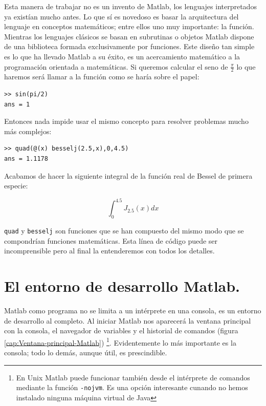 Esta manera de trabajar no es un invento de Matlab, los lenguajes
interpretados ya existían mucho antes. Lo que sí es novedoso es basar
la arquitectura del lenguaje en conceptos matemáticos; entre ellos uno
muy importante: la función. Mientras los lenguajes clásicos se basan
en subrutinas o objetos Matlab dispone de una biblioteca formada
exclusivamente por funciones. Este diseño tan simple es lo que ha
llevado Matlab a su éxito, es un acercamiento matemático a la
programación orientada a matemáticas. Si queremos calcular el seno de
$\frac{\pi}{2}$ lo que haremos será llamar a la función como se haría
sobre el papel:

\begin{verbatim}
>> sin(pi/2)
ans = 1
\end{verbatim}
Entonces nada impide usar el mismo concepto para resolver problemas
mucho más complejos:

\begin{verbatim}
>> quad(@(x) besselj(2.5,x),0,4.5)
ans = 1.1178
\end{verbatim}
Acabamos de hacer la siguiente integral de la función real de Bessel
de primera especie:

$$\int_{0}^{4.5}J_{2.5}(x)dx$$

\texttt{quad} y \texttt{besselj} son funciones que se
han compuesto del mismo modo que se compondrían funciones matemáticas.
Esta línea de código puede ser incomprensible pero al final la
entenderemos con todos los detalles.


\section{El entorno de desarrollo Matlab.}

Matlab como programa no se limita a un intérprete en una consola, es
un entorno de desarrollo al completo. Al iniciar Matlab nos aparecerá
la ventana principal con la consola, el navegador de variables y el
historial de comandos (figura \ref{cap:Ventana-principal-Matlab})%
\footnote{En Unix Matlab puede funcionar también desde el intérprete
de comandos mediante la función \texttt{-nojvm}.  Es una opción interesante
cunando no hemos instalado ninguna máquina virtual de Java}. Evidentemente
lo más importante es la consola; todo lo demás, aunque útil, es prescindible.


